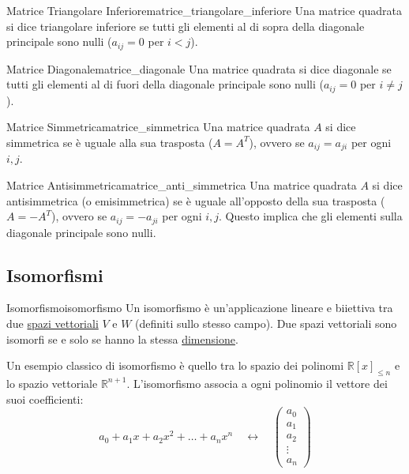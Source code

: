 \documentclass{article}
\begin{document}
\begin{definition}{Matrice Triangolare Inferiore}{matrice_triangolare_inferiore}
Una matrice quadrata si dice triangolare inferiore se tutti gli elementi al di sopra della diagonale principale sono nulli ($a_{ij} = 0$ per $i<j$).
\end{definition}

\begin{definition}{Matrice Diagonale}{matrice_diagonale}
Una matrice quadrata si dice diagonale se tutti gli elementi al di fuori della diagonale principale sono nulli ($a_{ij} = 0$ per $i \neq j$).
\end{definition}

\begin{definition}{Matrice Simmetrica}{matrice_simmetrica}
Una matrice quadrata $A$ si dice simmetrica se è uguale alla sua trasposta ($A = A^T$), ovvero se $a_{ij} = a_{ji}$ per ogni $i,j$.
\end{definition}

\begin{definition}{Matrice Antisimmetrica}{matrice_anti_simmetrica}
Una matrice quadrata $A$ si dice antisimmetrica (o emisimmetrica) se è uguale all'opposto della sua trasposta ($A = -A^T$), ovvero se $a_{ij} = -a_{ji}$ per ogni $i,j$. Questo implica che gli elementi sulla diagonale principale sono nulli.
\end{definition}

\subsection{Isomorfismi}

\begin{definition}{Isomorfismo}{isomorfismo}
    Un isomorfismo è un'applicazione lineare e biiettiva tra due \hyperref[def:spazio_vettoriale]{spazi vettoriali} $V$ e $W$ (definiti sullo stesso campo). Due spazi vettoriali sono isomorfi se e solo se hanno la stessa \hyperref[def:dimensione_spazio_vettoriale]{dimensione}.
\end{definition}

Un esempio classico di isomorfismo è quello tra lo spazio dei polinomi $\mathbb{R}[x]_{\le n}$ e lo spazio vettoriale $\mathbb{R}^{n+1}$. L'isomorfismo associa a ogni polinomio il vettore dei suoi coefficienti:
\[ a_0 + a_1 x + a_2 x^2 + \dots + a_n x^n \quad \longleftrightarrow \quad \begin{pmatrix}
    a_0 \\
    a_1 \\
    a_2 \\
    \vdots \\
    a_n
\end{pmatrix} \]
\end{document}
